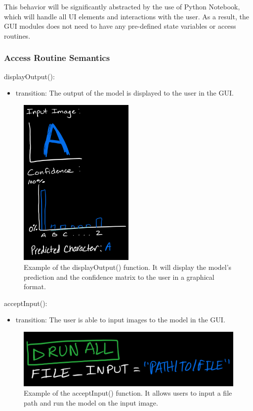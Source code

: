 \documentclass[12pt, titlepage]{article}
\begin{document}
This behavior will be significantly abstracted by the use of Python Notebook,
which will handle all UI elements and interactions with the user. As a result,
the GUI modules does not need to have any pre-defined state variables or access
routines.

\subsubsection{Access Routine Semantics}

\noindent displayOutput():
\begin{itemize}
\item transition: The output of the model is displayed to the user in the GUI.
\end{itemize}

\begin{figure}
\centering
\includegraphics[width=0.5\textwidth]{displayOutput.jpeg}
\caption{Example of the displayOutput() function. It will display the
  model's prediction and the confidence matrix to the user in a graphical
  format.}
\label{fig:displayOutput}
\end{figure}

\noindent acceptInput():
\begin{itemize}
\item transition: The user is able to input images to the model in the GUI.
\end{itemize}

\begin{figure}
  \centering
  \includegraphics[width=1\textwidth]{acceptInput.jpeg}
  \caption{Example of the acceptInput() function. It allows users to input a
  file path and run the model on the input image.}
  \label{fig:acceptInput}
  \end{figure}
\end{document}
